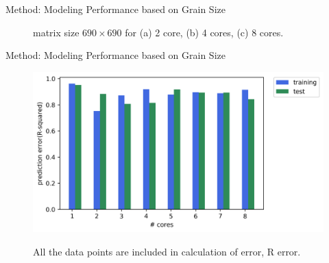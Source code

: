 \documentclass[10pt]{beamer}
\begin{document}
\begin{frame}{Method: Modeling Performance based on Grain Size}
\begin{outline}
\begin{figure}[H]
		\caption{matrix size $690\times690$ for (a) 2 core, (b) 4 cores, (c) 8 cores.}	
		\label{fig18}
	\end{figure}
	\end{outline}
\end{frame}

\begin{frame}{Method: Modeling Performance based on Grain Size}
	\begin{outline}
		\begin{figure}[H]
			\centering
			{\includegraphics[scale=.32]{images/polyfit/fig_690_total_error_r2.png}\label{fig17:a}}
	
			\caption{All the data points are included in calculation of error, R error.}	
			\label{fig17}
		\end{figure}
	\end{outline}
\end{frame}

\end{document}
